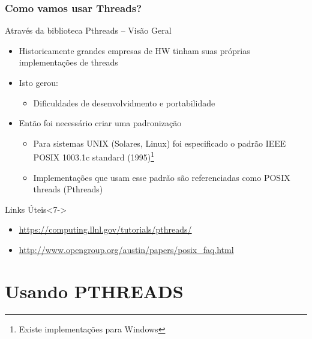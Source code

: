 \documentclass[10pt, xcolor=x11names]{beamer}
\begin{document}
\begin{frame} \frametitle{Como vamos usar Threads?}
	\begin{block}{Através da biblioteca Pthreads -- Visão Geral}
		\begin{itemize}[<+->]
			\item Historicamente grandes empresas de HW tinham suas próprias implementações de threads
			\item Isto gerou:
				\begin{itemize}
					\item Dificuldades de desenvolvidmento e portabilidade
				\end{itemize}
			\item Então foi necessário criar uma padronização
				\begin{itemize}
					\item Para sistemas UNIX (Solares, Linux) foi especificado o padrão IEEE POSIX 1003.1c standard (1995)\footnote{Existe implementações para Windows}
					\item Implementações que usam esse padrão são referenciadas como POSIX threads (Pthreads)
				\end{itemize}
		\end{itemize}
	\end{block}

	\begin{block}{Links Úteis}<7->
		\begin{itemize}
			\item \url{https://computing.llnl.gov/tutorials/pthreads/}
			\item \url{http://www.opengroup.org/austin/papers/posix_faq.html}
			
		\end{itemize}
	\end{block}
\end{frame}

\section{Usando PTHREADS} 
\end{document}
